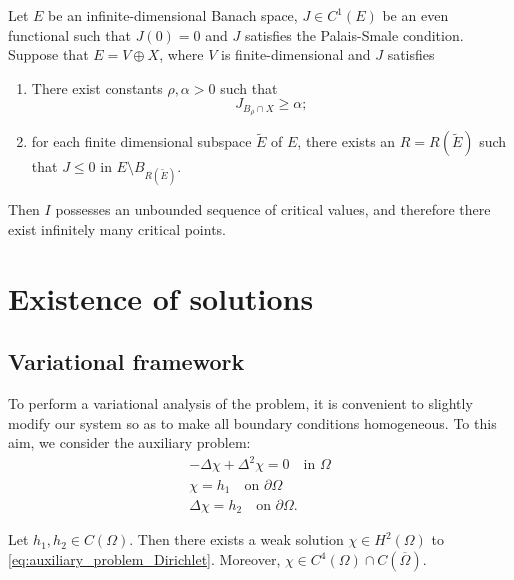 \documentclass[reqno]{amsart}
\begin{document}
\begin{theorem}
 \label{thm:Mountain_Pass}
Let $E$ be an infinite-dimensional Banach space, $J \in C^1(E)$ be an even 
functional such that $J(0) = 0$ and $J$ satisfies the Palais-Smale condition. 
Suppose that $E = V \oplus X$, where $V$ is finite-dimensional and $J$ satisfies
\begin{enumerate}
 \item There exist constants $\rho, \alpha > 0$ such that
 \[
 J_{B_\rho \cap X} \geq \alpha;
 \]

 \item for each finite dimensional subspace $\widetilde E$ of $E$, there exists an $R = R(\widetilde E)$ such that $J \leq 0$ in $E \setminus B_{R(\widetilde E)}$.
 \end{enumerate}
Then $I$ possesses an unbounded sequence of critical values, and therefore there exist infinitely many critical points.
\end{theorem}

\section{Existence of solutions}
\label{sec:existence}
\subsection{Variational framework}

To perform a variational analysis of the problem, it is convenient to slightly 
modify our system so as to make all boundary conditions homogeneous. 
To this aim, we consider the auxiliary problem:
\begin{equation}
 \label{eq:auxiliary_problem_Dirichlet}
\begin{gathered}
 - \Delta \chi + \Delta^2 \chi  =  0  \quad \text{in } \Omega \\
 \chi  =  h_1  \quad \text{on } \partial\Omega \\
 \Delta \chi  =  h_2  \quad \text{on } \partial\Omega.
 \end{gathered}
\end{equation}

\begin{lemma}
 \label{lem:exitence_auxiliary_problem}
Let $h_1, h_2 \in C(\Omega)$. Then there exists a weak solution 
$\chi \in H^2(\Omega)$ to \eqref{eq:auxiliary_problem_Dirichlet}. 
Moreover, $\chi \in C^4(\Omega) \cap C(\overline \Omega)$.
\end{lemma}
\end{document}
